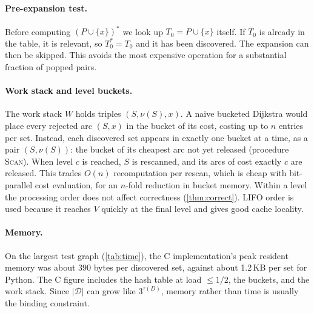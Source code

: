 \documentclass[11pt]{article}
\theoremstyle{definition}
\newcommand{\set}[1]{\{#1\}}
\begin{document}
\paragraph{Pre-expansion test.}
Before computing $(P\cup\set x)^*$ we look up $T_0=P\cup\set x$ itself. If
$T_0$ is already in the table, it is relevant, so $T_0^*=T_0$ and it has
been discovered. The expansion can then be skipped. This avoids the most
expensive operation for a substantial fraction of popped pairs.

\paragraph{Work stack and level buckets.}
The work stack $W$ holds triples $(S,\nu(S),x)$. A naive bucketed Dijkstra
would place every rejected arc $(S,x)$ in the bucket of its cost, costing up
to $n$ entries per set. Instead, each discovered set appears in exactly one
bucket at a time, as a pair $(S,\nu(S))$: the bucket of its cheapest arc not
yet released (procedure \textsc{Scan}). When level $c$ is reached, $S$ is
rescanned, and its arcs of cost exactly $c$ are released. This trades $O(n)$
recomputation per rescan, which is cheap with bit-parallel cost evaluation,
for an $n$-fold reduction in bucket memory. Within a level the processing
order does not affect correctness (\cref{thm:correct}). LIFO order is used
because it reaches $V$ quickly at the final level and gives good cache
locality.

\paragraph{Memory.}
On the largest test graph (\cref{tab:time}), the C implementation's peak
resident memory was about 390 bytes per discovered set, against about
1.2\,KB per set for Python. The C figure includes the hash table at load
$\le1/2$, the buckets, and the work stack. Since $|\mathcal{D}|$ can grow
like $3^{\tau(D)}$, memory rather than time is usually the binding
constraint.
\end{document}
